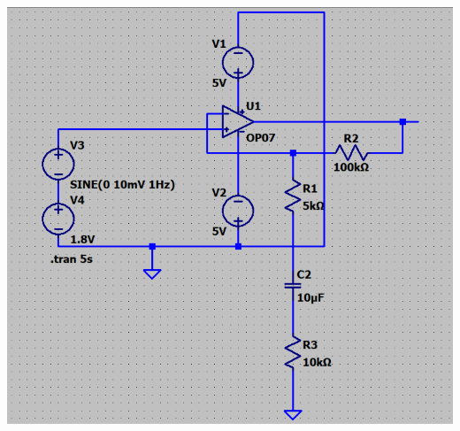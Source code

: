 \documentclass{article}
\begin{document}
\includegraphics[width=\textwidth]{images/Op-Amp Amplifer.png}
\newpage
\end{document}
